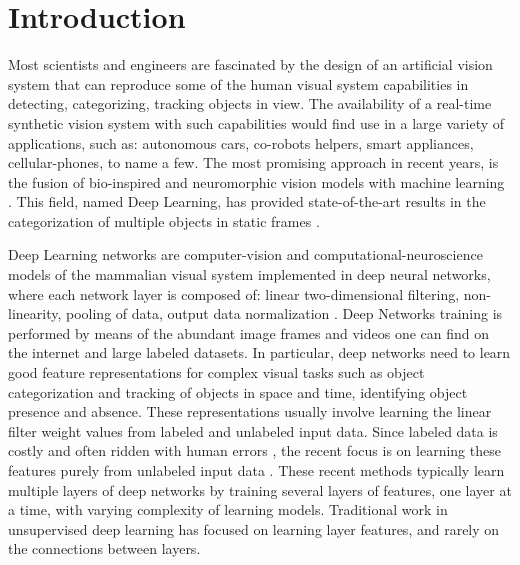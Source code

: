 \documentclass{article} %
\begin{document}
\section{Introduction}

Most scientists and engineers are fascinated by the design of an artificial vision system that can reproduce some of the human visual system capabilities in detecting, categorizing, tracking objects in view. The availability of a real-time synthetic vision system with such capabilities would find use in a large variety of applications, such as: autonomous cars, co-robots helpers, smart appliances, cellular-phones, to name a few. The most promising approach in recent years, is the fusion of bio-inspired and neuromorphic vision models with machine learning \cite{lecun_gradient-based_1998,hadsell_dimensionality_2006,gregor_structured_2011,riesenhuber_hierarchical_1999,serre_feedforward_2007,serre_neuromorphic_2010,jarrett_what_2009,lecun_convolutional_2010,boureau_theoretical_2010}. This field, named Deep Learning, has provided state-of-the-art results in the categorization of multiple objects in static frames \cite{krizhevsky_imagenet_2012}.

Deep Learning networks are computer-vision and computational-neuroscience models of the mammalian visual system implemented in deep neural networks, where each network layer is composed of: linear two-dimensional filtering, non-linearity, pooling of data, output data normalization \cite{jarrett_what_2009,lecun_convolutional_2010,boureau_theoretical_2010}. 
Deep Networks training is performed by means of the abundant image frames and videos one can find on the internet and large labeled datasets. In particular, deep networks need to learn good feature representations for complex visual tasks such as object categorization and tracking of objects in space and time, identifying object presence and absence. These representations usually involve learning the linear filter weight values from labeled and unlabeled input data. Since labeled data is costly and often ridden with human errors \cite{karpathy_lessons_2011, torralba_unbiased_2011, hou_meta-theory_2012}, the recent focus is on learning these features purely from unlabeled input data \cite{olshausen_emergence_1996, hyvarinen_independent_2000, hinton_fast_2006, vincent_extracting_2008, coates_analysis_2011}. These recent methods typically learn multiple layers of deep networks by training several layers of features, one layer at a time, with varying complexity of learning models. Traditional work in unsupervised deep learning has focused on learning layer features, and rarely on the connections between layers.
\end{document}
